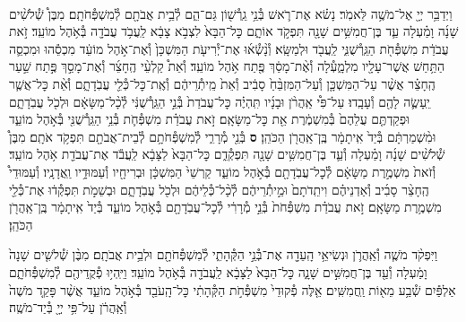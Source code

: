 \documentclass[twoside, openany, parskip=half, 11pt]{book}
\begin{document}
\begin{footnotesize}
\begin{multicols}{2}
\\
וַיְדַבֵּ֥ר יְיָ֖ אֶל־מֹשֶׁ֥ה לֵּאמֹֽר׃ נָשׂ֗א אֶת־רֹ֛אשׁ בְּ֯נֵ֥י גֵֽרְ֯שׁ֖וֹן גַּם־הֵ֑ם לְ֯בֵ֥ית אֲבֹתָ֖ם לְ֯מִשְׁפְּ֯חֹתָֽם׃ מִבֶּן֩ שְׁ֯לֹשִׁ֨ים שָׁנָ֜ה וָמַ֗עְלָה עַ֛ד בֶּן־חֲמִשִּׁ֥ים שָׁנָ֖ה תִּפְקֹ֣ד אוֹתָ֑ם כׇּל־הַבָּא֙ לִצְבֹ֣א צָבָ֔א לַֽעֲבֹ֥ד עֲבֹדָ֖ה בְּ֯אֹ֥הֶל מוֹעֵֽד׃ זֹ֣את עֲבֹדַ֔ת מִשְׁפְּ֯חֹ֖ת הַגֵּֽרְ֯שֻׁנִּ֑י לַֽעֲבֹ֖ד וּלְמַשָּֽׂא׃  וְ֯נָ֨שְׂ֯א֜וּ אֶת־יְ֯רִיעֹ֤ת הַמִּשְׁכָּן֙ וְ֯אֶת־אֹ֣הֶל מוֹעֵ֔ד מִכְסֵ֕הוּ וּמִכְסֵ֛ה הַתַּ֥חַשׁ אֲשֶׁר־עָלָ֖יו מִלְמָ֑עְ֯לָה וְ֯אֶ֨ת־מָסַ֔ךְ פֶּ֖תַח אֹ֥הֶל מוֹעֵֽד׃ וְ֯אֵת֩ קַלְעֵ֨י הֶֽחָצֵ֜ר וְ֯אֶת־מָסַ֣ךְ פֶּ֣תַח שַׁ֣עַר הֶֽחָצֵ֗ר אֲשֶׁ֨ר עַל־הַמִּשְׁכָּ֤ן וְ֯עַל־הַמִּזְבֵּ֨חַ֙ סָבִ֔יב וְ֯אֵת֙ מֵֽיתְ֯רֵיהֶ֔ם וְ֯אֶֽת־כׇּל־כְּ֯לֵ֖י עֲבֹֽדָתָ֑ם וְ֯אֵ֨ת כׇּל־אֲשֶׁ֧ר יֵֽעָשֶׂ֛ה לָהֶ֖ם וְ֯עָבָֽדוּ׃ עַל־פִּ֩י אַֽהֲרֹ֨ן וּבָנָ֜יו תִּֽהְיֶ֗ה כׇּל־עֲבֹדַת֙ בְּ֯נֵ֣י הַגֵּֽרְ֯שֻׁנִּ֔י לְ֯כָ֨ל־מַשָּׂאָ֔ם וּלְכֹ֖ל עֲבֹֽדָתָ֑ם וּפְקַדְתֶּ֤ם עֲלֵהֶם֙ בְּ֯מִשְׁמֶ֔רֶת אֵ֖ת כׇּל־מַשָּׂאָֽם׃ זֹ֣את עֲבֹדַ֗ת מִשְׁפְּ֯חֹ֛ת בְּ֯נֵ֥י הַגֵּֽרְ֯שֻׁנִּ֖י בְּ֯אֹ֣הֶל מוֹעֵ֑ד וּמִ֨שְׁמַרְתָּ֔ם בְּ֯יַד֙ אִֽיתָמָ֔ר בֶּֽן־אַֽהֲרֹ֖ן הַכֹּהֵֽן׃ \textbf{ס}  בְּ֯נֵ֖י מְ֯רָרִ֑י לְ֯מִשְׁפְּ֯חֹתָ֥ם לְ֯בֵית־אֲבֹתָ֖ם תִּפְקֹ֥ד אֹתָֽם׃ מִבֶּן֩ שְׁ֯לֹשִׁ֨ים שָׁנָ֜ה וָמַ֗עְלָה וְ֯עַ֛ד בֶּן־חֲמִשִּׁ֥ים שָׁנָ֖ה תִּפְקְ֯דֵ֑ם כׇּל־הַבָּא֙ לַצָּבָ֔א לַֽעֲבֹ֕ד אֶת־עֲבֹדַ֖ת אֹ֥הֶל מוֹעֵֽד׃ וְ֯זֹאת֙ מִשְׁמֶ֣רֶת מַשָּׂאָ֔ם לְ֯כׇל־עֲבֹֽדָתָ֖ם בְּ֯אֹ֣הֶל מוֹעֵ֑ד קַרְשֵׁי֙ הַמִּשְׁכָּ֔ן וּבְרִיחָ֖יו וְ֯עַמּוּדָ֥יו וַֽאֲדָנָֽיו׃ וְ֯עַמּוּדֵי֩ הֶֽחָצֵ֨ר סָבִ֜יב וְ֯אַדְנֵיהֶ֗ם וִיתֵֽדֹתָם֙ וּמֵ֣יתְ֯רֵיהֶ֔ם לְ֯כָ֨ל־כְּ֯לֵיהֶ֔ם וּלְכֹ֖ל עֲבֹֽדָתָ֑ם וּבְשֵׁמֹ֣ת תִּפְקְ֯ד֔וּ אֶת־כְּ֯לֵ֖י מִשְׁמֶ֥רֶת מַשָּׂאָֽם׃ זֹ֣את עֲבֹדַ֗ת מִשְׁפְּ֯חֹת֙ בְּ֯נֵ֣י מְ֯רָרִ֔י לְ֯כׇל־עֲבֹֽדָתָ֖ם בְּ֯אֹ֣הֶל מוֹעֵ֑ד בְּ֯יַד֙ אִֽיתָמָ֔ר בֶּֽן־אַֽהֲרֹ֖ן הַכֹּהֵֽן׃


וַיִּפְקֹ֨ד מֹשֶׁ֧ה וְ֯אַֽהֲרֹ֛ן וּנְשִׂיאֵ֥י הָֽעֵדָ֖ה אֶת־בְּ֯נֵ֣י הַקְּ֯הָתִ֑י לְ֯מִשְׁפְּ֯חֹתָ֖ם וּלְבֵ֥ית אֲבֹתָֽם׃ מִבֶּ֨ן שְׁ֯לשִׁ֤ים שָׁנָה֙ וָמַ֔עְלָה וְ֯עַ֖ד בֶּן־חֲמִשִּׁ֣ים שָׁנָ֑ה כׇּל־הַבָּא֙ לַצָּבָ֔א לַֽעֲבֹדָ֖ה בְּ֯אֹ֥הֶל מוֹעֵֽד׃ וַיִּֽהְי֥וּ פְ֯קֻֽדֵיהֶ֖ם לְ֯מִשְׁפְּ֯חֹתָ֑ם אַלְפַּ֕יִם שְׁ֯בַ֥ע מֵא֖וֹת וַֽחֲמִשִּֽׁים׃ אֵ֤לֶּה פְ֯קוּדֵי֙ מִשְׁפְּ֯חֹ֣ת הַקְּ֯הָתִ֔י כׇּל־הָֽעֹבֵ֖ד בְּ֯אֹ֣הֶל מוֹעֵ֑ד אֲשֶׁ֨ר פָּקַ֤ד מֹשֶׁה֙ וְ֯אַֽהֲרֹ֔ן עַל־פִּ֥י יְיָ֖ בְּ֯יַד־מֹשֶֽׁה׃



\end{multicols}
\end{footnotesize}
\end{document}
